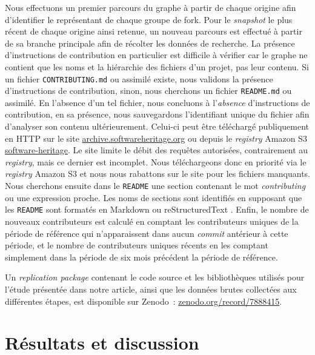 \documentclass[dvipsnames,runningheads]{llncs}
\newcommand{\en}[1]{\foreignlanguage{english}{\emph{#1}}}
\begin{document}
    Nous effectuons un premier parcours du graphe à partir de chaque origine afin d'identifier le représentant
    de chaque groupe de fork. Pour le \en{snapshot} le plus récent de chaque origine ainsi retenue, un nouveau
    parcours est effectué à partir de sa branche principale afin de récolter les données de recherche. La
    présence d'instructions de contribution en particulier est difficile à vérifier car le graphe ne contient
    que les noms et la hiérarchie des fichiers d'un projet, pas leur contenu. Si un fichier
    \texttt{CONTRIBUTING.md} ou assimilé existe, nous validons la présence d'instructions de contribution,
    sinon, nous cherchons un fichier \texttt{README.md} ou assimilé. En l'absence d'un tel fichier, nous
    concluons à l'\emph{absence} d'instructions de contribution, en sa présence, nous sauvegardons
    l'identifiant unique du fichier afin d'analyser son contenu ultérieurement. Celui-ci peut être téléchargé
    publiquement en HTTP sur le site
    \href{https://archive.softwareheritage.org/}{archive.softwareheritage.org} ou depuis le \en{registry}
    Amazon S3 \href{https://registry.opendata.aws/software-heritage}{software-heritage}. Le site limite le
    débit des requêtes autorisées, contrairement au \en{registry}, mais ce dernier est incomplet. Nous
    téléchargeons donc en priorité via le \en{registry} Amazon S3 et nous nous rabattons sur le site pour les
    fichiers manquants. Nous cherchons ensuite dans le \texttt{README} une section contenant le mot
    \en{contributing} ou une expression proche. Les noms de sections sont identifiés en supposant que les
    \texttt{README} sont formatés en Markdown ou reStructuredText \parencite{markdown-headings,rst-sections}.
    Enfin, le nombre de nouveaux contributeurs est calculé en comptant les contributeurs uniques de la période
    de référence qui n'apparaissent dans aucun \en{commit} antérieur à cette période, et le nombre de
    contributeurs uniques récents en les comptant simplement dans la période de six mois précédent la période
    de référence.

    Un \en{replication package} contenant le code source et les bibliothèques utilisés pour l'étude présentée
    dans notre article, ainsi que les données brutes collectées aux différentes étapes, est disponible sur
    Zenodo : \href{https://zenodo.org/record/7888415}{zenodo.org/record/7888415}.

    \section{Résultats et discussion}
\end{document}
